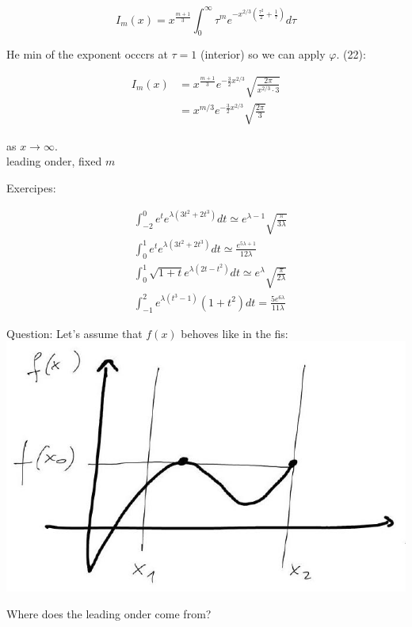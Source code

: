 \documentclass[10pt]{article}
\begin{document}
$$
I_{m}(x)=x^{\frac{m+1}{3}} \int_{0}^{\infty} \tau^{m} e^{-x^{2 / 3}\left(\frac{\tau^{2}}{2}+\frac{1}{\tau}\right)} d \tau
$$

He min of the exponent occcrs at $\tau=1$ (interior) so we can apply $\varphi$. (22):

$$
\begin{aligned}
I_{m}(x) & =x^{\frac{m+1}{3}} e^{-\frac{3}{2} x^{2 / 3}} \sqrt{\frac{2 \pi}{x^{2 / 3} \cdot 3}} \\
& =x^{m / 3} e^{-\frac{3}{2} x^{2 / 3}} \sqrt{\frac{2 \pi}{3}}
\end{aligned}
$$

as $x \rightarrow \infty$.\\
leading onder, fixed $m$

Exercipes:

$$
\begin{aligned}
& \int_{-2}^{0} e^{t} e^{\lambda\left(3 t^{2}+2 t^{3}\right)} d t \simeq e^{\lambda-1} \sqrt{\frac{\pi}{3 \lambda}} \\
& \int_{0}^{1} e^{t} e^{\lambda\left(3 t^{2}+2 t^{3}\right)} d t \simeq \frac{e^{5 \lambda+1}}{12 \lambda} \\
& \int_{0}^{1} \sqrt{1+t} e^{\lambda\left(2 t-t^{2}\right)} d t \simeq e^{\lambda} \sqrt{\frac{\pi}{2 \lambda}} \\
& \int_{-1}^{2} e^{\lambda\left(t^{3}-1\right)}\left(1+t^{2}\right) d t=\frac{5 e^{6 \lambda}}{11 \lambda}
\end{aligned}
$$

Question: Let's assume that $f(x)$ behoves like in the fis:\\
\includegraphics[max width=\textwidth, center]{2025_10_19_6d9f59a2c3b97d481c52g-8}

Where does the leading onder come from?
\end{document}
